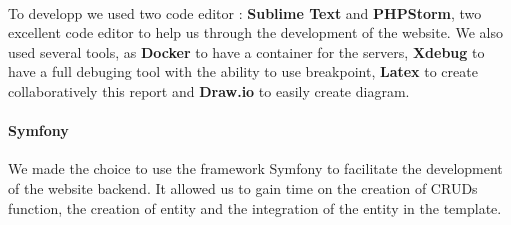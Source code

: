 			\paragraph{}
				To developp we used two code editor : \textbf{Sublime Text} and \textbf{PHPStorm}, two excellent code editor to help us through the development of the website. We also used several tools, as \textbf{Docker} to have a container for the servers, \textbf{Xdebug} to have a full debuging tool with the ability to use breakpoint, \textbf{Latex} to create collaboratively this report and \textbf{Draw.io} to easily create diagram.

				\paragraph{Symfony}
					We made the choice to use the framework Symfony to facilitate the development of the website backend. It allowed us to gain time on the creation of CRUDs function, the creation of entity and the integration of the entity in the template.
